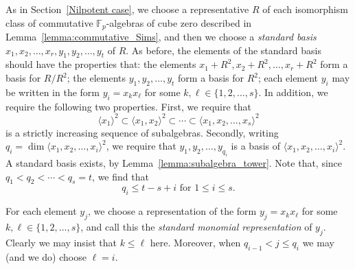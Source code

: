 \documentclass[12pt]{article}
\begin{document}
As in Section~\ref{Nilpotent case}, we choose a representative $R$ of each isomorphism class of commutative $\mathbb{F}_p$-algebras of cube zero described in Lemma~\ref{lemma:commutative_Sims}, and then we choose a \emph{standard basis} $x_1,x_2,\ldots,x_r,y_1,y_2,\ldots ,y_t$ of $R$. As before, the elements of the standard basis should have the properties that: the elements $x_1+R^2,x_2+R^2,\ldots,x_r+R^2$ form a basis for $R/R^2$; the elements $y_1,y_2,\ldots,y_t$ form a basis for $R^2$; each element $y_i$ may be written in the form $y_i=x_kx_\ell$ for some $k,\ell\in\{1,2,\ldots,s\}$. In addition, we require the following two properties. First, we require that
\[
\langle x_1\rangle^2\subset \langle x_1,x_2\rangle^2\subset \cdots \subset \langle x_1,x_2,\ldots,x_s \rangle^2
\]
is a strictly increasing sequence of subalgebras. Secondly, writing $q_i=\dim \langle x_1,x_2,\ldots,x_i \rangle^2$, we require that $y_1,y_2,\ldots ,y_{q_i}$ is a basis of $\langle x_1,x_2,\ldots,x_i \rangle^2$. A standard basis exists, by Lemma~\ref{lemma:subalgebra_tower}. Note that, since $q_1<q_2<\cdots<q_s=t$, we find that
\begin{equation}
\label{q}
q_i\leq t-s+i\text{ for }1\leq i\leq s.
\end{equation} 

For each element $y_j$, we choose a representation of the form $y_j=x_kx_\ell$ for some $k,\ell\in\{1,2,\ldots,s\}$, and call this the \emph{standard monomial representation} of $y_j$.
Clearly we may insist that $k\leq \ell$ here. Moreover, when $q_{i-1}<j\leq q_{i}$ we may (and we do) choose $\ell=i$.
\end{document}
